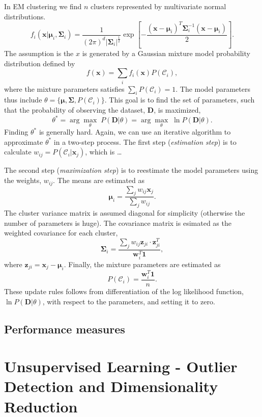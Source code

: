 \documentclass[oneside]{memoir}
\renewcommand{\vec}[1]{\ensuremath{\bm{#1}}}
\begin{document}
In EM clustering we find $n$ clusters represented by multivariate normal distributions.
\begin{equation}
  \label{EM clustering f}
  f_i(\vec{x}|\vec{\mu}_i,\vec{\Sigma}_i) = \frac{1}{(2\pi)^d |\vec{\Sigma}_i|^{\frac{1}{2}}}  \exp \left[ - \frac{(\vec{x}-\vec{\mu}_i)^T\vec{\Sigma}_i^{-1}(\vec{x}-\vec{\mu}_i)}{2} \right]. 
\end{equation}
The assumption is the $x$ is generated by a Gaussian mixture model probability distribution defined by
\begin{equation}
  \label{gaussian mixture model}
f(\vec{x}) = \sum_i f_i(\vec{x}) P(\mathcal{C}_i),
\end{equation}
where the mixture parameters satisfies $\sum_i P(\mathcal{C}_i) = 1$. The model parameters thus include $\theta = \{ \vec{\mu},\vec{\Sigma},P(\mathcal{C}_i)\}$. This goal is to find the set of parameters, such that the probability of observing the dataset, $\vec{D}$, is maximized,
\begin{equation}
  \label{theta max}
  \theta^* = \arg \max_{\theta} \; P(\vec{D}|\theta) =  \arg \max_{\theta} \; \ln P(\vec{D}|\theta).
\end{equation}
Finding $\theta^*$ is generally hard. Again, we can use an iterative algorithm to approximate $\theta^*$ in a two-step process. The first step (\emph{estimation step}) is to calculate $w_{ij} = P(\mathcal{C}_i|\vec{x}_j)$, which is \dots

The second step (\emph{maximization step}) is to reestimate the model parameters using the weights, $w_{ij}$. The means are estimated as
\begin{equation}
  \label{EM means}
  \vec{\mu}_i = \frac{\sum_j w_{ij} \vec{x}_j}{\sum_j w_{ij}}.
\end{equation}
The cluster variance matrix is assumed diagonal for simplicity (otherwise the number of parameters is huge). The covariance matrix is esimated as the weighted covariance for each cluster,
\begin{equation}
  \label{covariance estimate}
  \vec{\Sigma}_i = \frac{\sum_j w_{ij} \vec{z}_{ji}\cdot \vec{z}^T_{ji}}{\vec{w}_i^T\bm{1}},
\end{equation}
where $\vec{z}_{ji} = \vec{x}_j - \vec{\mu}_i$. Finally, the mixture parameters are estimated as
\begin{equation}
  \label{mixture parameter estimation}
  P(\mathcal{C}_i) = \frac{\vec{w}_i^T \vec{1}}{n}.
\end{equation}
These update rules follows from differentiation of the log likelihood function, $\ln P(\vec{D}|\theta)$, with respect to the parameters, and setting it to zero. 


\subsection{Performance measures}


\section{Unsupervised Learning - Outlier Detection and Dimensionality Reduction}
\end{document}

